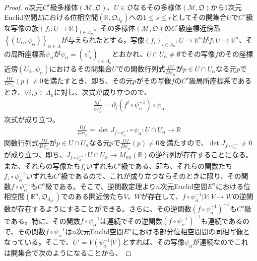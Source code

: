 \documentclass[dvipdfmx]{jsarticle}
\begin{document}
\begin{proof}
$n$次元$C^{r}$級多様体$\left( \mathcal{M},\mathfrak{O} \right)$、$U \in \mathfrak{O}$なるその多様体$\left( \mathcal{M},\mathfrak{O} \right)$から1次元Euclid空間$E$における位相空間$\left( \mathbb{R},\mathfrak{O}_{d_{E}} \right)$への$1\leq s \leq r$としてその開集合$U$で$C^{s}$級な写像の族$\left\{ f_i :U \rightarrow \mathbb{R} \right\}_{i\in \varLambda_n } $、その多様体$\left( \mathcal{M},\mathfrak{O} \right)$の$C^{r}$級座標近傍系$\left\{ \left( U_{\alpha},\psi_{\alpha} \right) \right\}_{\alpha \in A}$が与えられたとする。写像$\left( f_i \right)_{i\in \varLambda_n } :U \rightarrow \mathbb{R}^n $が$f:U \rightarrow \mathbb{R}^n $、その局所座標系$\psi_\alpha $が$\psi_\alpha =\left( \psi_\alpha^i \right)_{i\in \varLambda_n }$とおかれ、$U\cap U_\alpha \ne \emptyset $でその写像$f$のその座標近傍$\left(U_\alpha ,\psi_\alpha \right)$におけるその開集合$U$での関数行列式$\frac{Df}{D\psi_\alpha }$が$p\in U\cap U_\alpha $なる元$p$で$\frac{Df}{D\psi_\alpha } (p) \ne 0$を満たすとき、即ち、その元$p$がその写像$f$の$C^s$級局所座標系であるとき、$\forall i,j\in \varLambda_n $に対し、次式が成り立つので、
\begin{align*}
\frac{\partial f^i }{\partial \psi_\alpha^j } = \partial_j \left( f^i \circ \psi_\alpha^{-1} \right) \circ \psi_\alpha
\end{align*}
次式が成り立つ。
\begin{align*}
\frac{Df}{D\psi_\alpha } = \det J_{f\circ \psi_\alpha^{-1} } \circ \psi_\alpha :U\cap U_\alpha \rightarrow \mathbb{R}
\end{align*}
関数行列式$\frac{Df}{D\psi_\alpha }$が$p\in U\cap U_\alpha $なる元$p$で$\frac{Df}{D\psi_\alpha } (p) \ne 0$を満たすので、$\det J_{f\circ \psi_\alpha^{-1} } \ne 0$が成り立つ、即ち、$J_{f\circ \psi_\alpha^{-1} } :U\cap U_\alpha \rightarrow M_{nn}\left(\mathbb{R}\right)$の逆行列が存在することになる。また、それらの写像たち$f_i $いずれも$C^s$級である、即ち、それらの関数たち$f_i \circ \psi_\alpha^{-1} $いずれも$C^s $級であるので、これが成り立つならそのときに限り、その関数$f\circ \psi_\alpha^{-1}$も$C^s$級である。そこで、逆関数定理より$n$次元Euclid空間$E^n $における位相空間$\left(\mathbb{R}^n ,\mathfrak{O}_{d_{E^n}}\right)$でのある開近傍たち$V$、$W$が存在して、$f\circ \psi_\alpha^{-1} |V : V\rightarrow W$の逆関数が存在するようにすることができる。さらに、その逆関数$\left(f\circ \psi_\alpha^{-1} \right)^{-1} $も$C^s$級である。特に、その関数$f\circ \psi_\alpha^{-1} $は連続でその逆関数$\left(f\circ \psi_\alpha^{-1} \right)^{-1} $も連続であるので、その関数$f\circ \psi_\alpha^{-1} $は$n$次元Euclid空間$E^n $における部分位相空間間の同相写像となっている。そこで、$U' = V\left( \psi_\alpha^{-1} |V \right)$とすれば、その写像$\psi_\alpha $が連続なのでこれは開集合で次のようになることから、

\end{proof}
\end{document}
